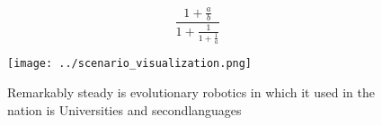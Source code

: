 \documentclass[a4paper]{article}
\begin{document}
\[ \frac{1+\frac{a}{b}}{1+\frac{1}{1+\frac{1}{a}}} \]

\begin{figure}
\centering
\texttt{[image: ../scenario\_visualization.png]}
\caption{Remarkably steady is evolutionary robotics in which it used in the nation is Universities and secondlanguages
}
\end{figure}
 
\end{document}
